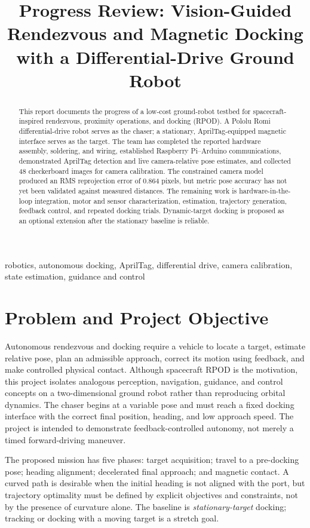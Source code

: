 \documentclass[conference,letterpaper,10pt]{IEEEtran}
\title{Progress Review: Vision-Guided Rendezvous and Magnetic Docking with a Differential-Drive Ground Robot}
\author{\IEEEauthorblockN{Zein Barakat, Justin Puran, Santiago Calderon-Rueda, and Ryan Flowers}
\IEEEauthorblockA{EGN 4060C -- Introduction to Robotics\\University of Central Florida, Orlando, Florida, USA\\November 2026}}
\begin{document}
\maketitle
\begin{abstract}
This report documents the progress of a low-cost ground-robot testbed for spacecraft-inspired rendezvous, proximity operations, and docking (RPOD). A Pololu Romi differential-drive robot serves as the chaser; a stationary, AprilTag-equipped magnetic interface serves as the target. The team has completed the reported hardware assembly, soldering, and wiring, established Raspberry Pi--Arduino communications, demonstrated AprilTag detection and live camera-relative pose estimates, and collected 48 checkerboard images for camera calibration. The constrained camera model produced an RMS reprojection error of 0.864 pixels, but metric pose accuracy has not yet been validated against measured distances. The remaining work is hardware-in-the-loop integration, motor and sensor characterization, estimation, trajectory generation, feedback control, and repeated docking trials. Dynamic-target docking is proposed as an optional extension after the stationary baseline is reliable.
\end{abstract}
\begin{IEEEkeywords}
robotics, autonomous docking, AprilTag, differential drive, camera calibration, state estimation, guidance and control
\end{IEEEkeywords}

\section{Problem and Project Objective}
Autonomous rendezvous and docking require a vehicle to locate a target, estimate relative pose, plan an admissible approach, correct its motion using feedback, and make controlled physical contact. Although spacecraft RPOD is the motivation, this project isolates analogous perception, navigation, guidance, and control concepts on a two-dimensional ground robot rather than reproducing orbital dynamics. The chaser begins at a variable pose and must reach a fixed docking interface with the correct final position, heading, and low approach speed. The project is intended to demonstrate feedback-controlled autonomy, not merely a timed forward-driving maneuver.

The proposed mission has five phases: target acquisition; travel to a pre-docking pose; heading alignment; decelerated final approach; and magnetic contact. A curved path is desirable when the initial heading is not aligned with the port, but trajectory optimality must be defined by explicit objectives and constraints, not by the presence of curvature alone. The baseline is \emph{stationary-target} docking; tracking or docking with a moving target is a stretch goal.
\end{document}
